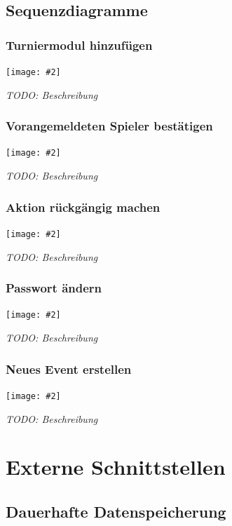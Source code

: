 \documentclass[11pt]{article}
\newcommand{\includediagram}[2]{
	\begin{center}
		\texttt{[image: \#2]}
	\end{center}
}
\begin{document}
\subsection{Sequenzdiagramme}

\subsubsection{Turniermodul hinzufügen}

\includediagram{1.0}{sequence-add-tournament-module.png}

\textit{TODO: Beschreibung}

\subsubsection{Vorangemeldeten Spieler bestätigen}

\includediagram{1.0}{sequence-verify-registered-player.png}

\textit{TODO: Beschreibung}

\subsubsection{Aktion rückgängig machen}

\includediagram{1.0}{sequence-undo-action.png}

\textit{TODO: Beschreibung}

\subsubsection{Passwort ändern}

\includediagram{1.0}{sequence-change-password.png}

\textit{TODO: Beschreibung}

\subsubsection{Neues Event erstellen}

\includediagram{1.0}{sequence-create-event.png}

\textit{TODO: Beschreibung}

\section{Externe Schnittstellen}

\subsection{Dauerhafte Datenspeicherung}
\end{document}
